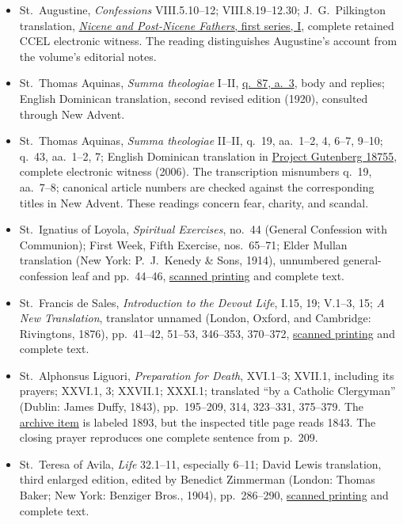 \begin{itemize}[leftmargin=1.25em,itemsep=0.2em]
\item St.~Augustine, \emph{Confessions} VIII.5.10--12; VIII.8.19--12.30; J.~G.~Pilkington translation, \href{https://ccel.org/ccel/s/schaff/npnf101/cache/npnf101.txt}{\emph{Nicene and Post-Nicene Fathers}, first series, I}, complete retained CCEL electronic witness. The reading distinguishes Augustine's account from the volume's editorial notes.
\item St.~Thomas Aquinas, \emph{Summa theologiae} I--II, \href{https://www.newadvent.org/summa/2087.htm\#article3}{q.~87, a.~3}, body and replies; English Dominican translation, second revised edition (1920), consulted through New Advent.
\item St.~Thomas Aquinas, \emph{Summa theologiae} II--II, q.~19, aa.~1--2, 4, 6--7, 9--10; q.~43, aa.~1--2, 7; English Dominican translation in \href{https://www.gutenberg.org/ebooks/18755}{Project Gutenberg 18755}, complete electronic witness (2006). The transcription misnumbers q.~19, aa.~7--8; canonical article numbers are checked against the corresponding titles in New Advent. These readings concern fear, charity, and scandal.
\item St.~Ignatius of Loyola, \emph{Spiritual Exercises}, no.~44 (General Confession with Communion); First Week, Fifth Exercise, nos.~65--71; Elder Mullan translation (New York: P.~J.~Kenedy \& Sons, 1914), unnumbered general-confession leaf and pp.~44--46, \href{https://archive.org/details/TheSpiritualExercisesOfStIgnatius}{scanned printing} and complete text.
\item St.~Francis de Sales, \emph{Introduction to the Devout Life}, I.15, 19; V.1--3, 15; \emph{A New Translation}, translator unnamed (London, Oxford, and Cambridge: Rivingtons, 1876), pp.~41--42, 51--53, 346--353, 370--372, \href{https://archive.org/details/introductiontod00salegoog}{scanned printing} and complete text.
\item St.~Alphonsus Liguori, \emph{Preparation for Death}, XVI.1--3; XVII.1, including its prayers; XXVI.1, 3; XXVII.1; XXXI.1; translated ``by a Catholic Clergyman'' (Dublin: James Duffy, 1843), pp.~195--209, 314, 323--331, 375--379. The \href{https://archive.org/details/preparation_for_death_1893-st_alphonsus_m_liguori}{archive item} is labeled 1893, but the inspected title page reads 1843. The closing prayer reproduces one complete sentence from p.~209.
\item St.~Teresa of Avila, \emph{Life} 32.1--11, especially 6--11; David Lewis translation, third enlarged edition, edited by Benedict Zimmerman (London: Thomas Baker; New York: Benziger Bros., 1904), pp.~286--290, \href{https://archive.org/details/lifeofteresajesu00tereuoft}{scanned printing} and complete text.
\end{itemize}\endgroup

